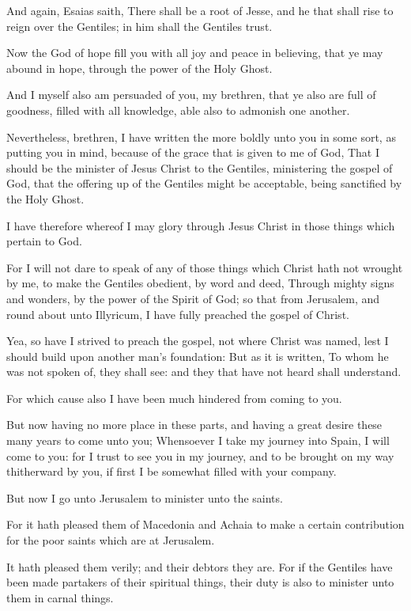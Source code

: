 \verse And again, Esaias saith, There shall be a root of Jesse, and he that shall rise to reign over the Gentiles; in him shall the Gentiles trust.

\verse Now the God of hope fill you with all joy and peace in believing, that ye may abound in hope, through the power of the Holy Ghost.

\verse And I myself also am persuaded of you, my brethren, that ye also are full of goodness, filled with all knowledge, able also to admonish one another.

\verse Nevertheless, brethren, I have written the more boldly unto you in some sort, as putting you in mind, because of the grace that is given to me of God, \verse That I should be the minister of Jesus Christ to the Gentiles, ministering the gospel of God, that the offering up of the Gentiles might be acceptable, being sanctified by the Holy Ghost.

\verse I have therefore whereof I may glory through Jesus Christ in those things which pertain to God.

\verse For I will not dare to speak of any of those things which Christ hath not wrought by me, to make the Gentiles obedient, by word and deed, \verse Through mighty signs and wonders, by the power of the Spirit of God; so that from Jerusalem, and round about unto Illyricum, I have fully preached the gospel of Christ.

\verse Yea, so have I strived to preach the gospel, not where Christ was named, lest I should build upon another man's foundation: \verse But as it is written, To whom he was not spoken of, they shall see: and they that have not heard shall understand.

\verse For which cause also I have been much hindered from coming to you.

\verse But now having no more place in these parts, and having a great desire these many years to come unto you; \verse Whensoever I take my journey into Spain, I will come to you: for I trust to see you in my journey, and to be brought on my way thitherward by you, if first I be somewhat filled with your company.

\verse But now I go unto Jerusalem to minister unto the saints.

\verse For it hath pleased them of Macedonia and Achaia to make a certain contribution for the poor saints which are at Jerusalem.

\verse It hath pleased them verily; and their debtors they are. For if the Gentiles have been made partakers of their spiritual things, their duty is also to minister unto them in carnal things.

